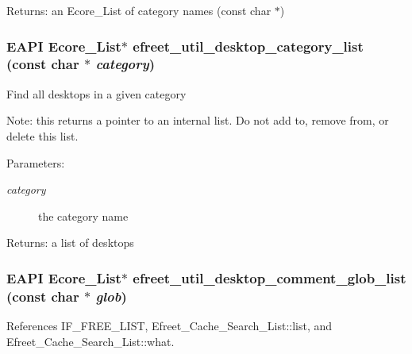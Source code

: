 \begin{Desc}
\item[Returns:]an Ecore\_\-List of category names (const char $\ast$) \end{Desc}
\subsubsection{\setlength{\rightskip}{0pt plus 5cm}EAPI Ecore\_\-List$\ast$ efreet\_\-util\_\-desktop\_\-category\_\-list (const char $\ast$ {\em category})}\label{efreet__utils_8h_eea99e97fbede6cceccf6178fd7092e7}


Find all desktops in a given category

Note: this returns a pointer to an internal list. Do not add to, remove from, or delete this list.

\begin{Desc}
\item[Parameters:]
\begin{description}
\item[{\em category}]the category name \end{description}
\end{Desc}
\begin{Desc}
\item[Returns:]a list of desktops \end{Desc}
\subsubsection{\setlength{\rightskip}{0pt plus 5cm}EAPI Ecore\_\-List$\ast$ efreet\_\-util\_\-desktop\_\-comment\_\-glob\_\-list (const char $\ast$ {\em glob})}\label{efreet__utils_8h_e17d6c23f6e683fd97a60956f0724539}




References IF\_\-FREE\_\-LIST, Efreet\_\-Cache\_\-Search\_\-List::list, and Efreet\_\-Cache\_\-Search\_\-List::what.
